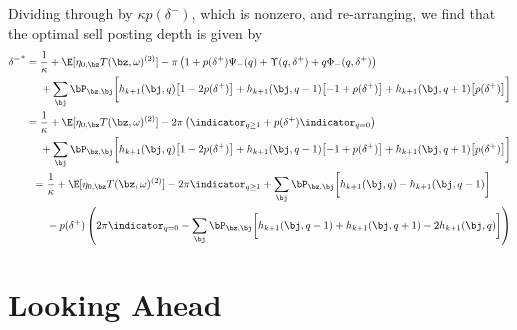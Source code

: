 \documentclass[12pt]{article}
\begin{document}
Dividing through by $\kappa p(\delta^-)$, which is nonzero, and re-arranging, we find that the optimal sell posting depth is given by
\begin{align}
\begin{split}
{\delta^-}^* & = \frac{1}{\kappa} + \E[\eta_{0,\bz} T(\bz, \omega)^{(2)}] - \pi \left( 1 + p(\delta^+)\Psi_-(q) + \Upsilon(q,\delta^+) + q \Phi_-(q,\delta^+) \right) \\
& \hphantom{{}={}} +  \sum_\bj \bP_{\bz,\bj} \biggl[ h_{k+1}(\bj, q) \bigl[ 1 - 2 p(\delta^+) \bigr] + h_{k+1}(\bj, q-1) \bigl[-1 + p(\delta^+) \bigr] + h_{k+1}(\bj, q+1) \bigl[ p(\delta^+) \bigr] \biggr]
\end{split} \\
\begin{split}
& = \frac{1}{\kappa} + \E[\eta_{0,\bz} T(\bz, \omega)^{(2)}] - 2 \pi \left( \indicator_{q \geq 1} + p(\delta^+)\indicator_{q = 0} \right) \\
& \hphantom{{}={}} +  \sum_\bj \bP_{\bz,\bj} \biggl[ h_{k+1}(\bj, q) \bigl[ 1 - 2 p(\delta^+) \bigr] + h_{k+1}(\bj, q-1) \bigl[-1 + p(\delta^+) \bigr] + h_{k+1}(\bj, q+1) \bigl[ p(\delta^+) \bigr] \biggr]
\end{split} \\
\begin{split}
& = \frac{1}{\kappa} + \E[\eta_{0,\bz} T(\bz, \omega)^{(2)}] - 2 \pi \indicator_{q \geq 1} + \sum_\bj \bP_{\bz,\bj} \biggl[ h_{k+1}(\bj, q) - h_{k+1}(\bj, q-1) \biggr] \\
& \hphantom{{}={}} -p(\delta^+) \left( 2 \pi \indicator_{q = 0} - \sum_\bj \bP_{\bz,\bj} \biggl[ h_{k+1}(\bj, q-1) + h_{k+1}(\bj, q+1) -2 h_{k+1}(\bj, q)  \biggr] \right)
\end{split}
\end{align}
\section*{Looking Ahead}
\end{document}
